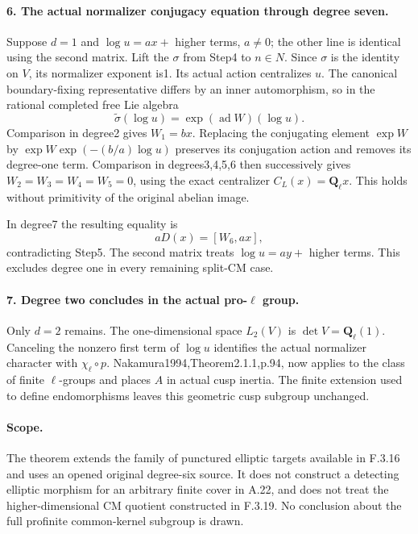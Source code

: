 \paragraph{6. The actual normalizer conjugacy equation through degree seven.}
Suppose $d=1$ and $\log u=ax+$ higher terms, $a\ne0$; the other
line is identical using the second matrix. Lift the $\sigma$ from
Step4 to $n\in N$. Since $\sigma$ is the identity on $V$, its
normalizer exponent is1. Its actual action centralizes $u$.
The canonical boundary-fixing representative differs by an inner
automorphism, so in the rational completed free Lie algebra
\[
 \widetilde\sigma(\log u)
 =\exp(\operatorname{ad}W)(\log u).
\]
Comparison in degree2 gives $W_1=bx$. Replacing the conjugating
element $\exp W$ by
$\exp W\exp(-(b/a)\log u)$ preserves its conjugation action and
removes its degree-one term. Comparison in degrees3,4,5,6 then
successively gives $W_2=W_3=W_4=W_5=0$, using the exact centralizer
$C_L(x)=\mathbf Q_\ell x$. This holds without primitivity of the
original abelian image.

In degree7 the resulting equality is
\[
 aD(x)=[W_6,ax],
\]
contradicting Step5. The second matrix treats $\log u=ay+$ higher
terms. This excludes degree one in every remaining split-CM case.

\paragraph{7. Degree two concludes in the actual pro-$\ell$ group.}
Only $d=2$ remains. The one-dimensional space $L_2(V)$ is
$\det V=\mathbf Q_\ell(1)$. Canceling the nonzero first term of
$\log u$ identifies the actual normalizer character with
$\chi_\ell\circ p$. Nakamura1994,Theorem2.1.1,p.94, now applies
to the class of finite $\ell$-groups and places $A$ in actual cusp
inertia. The finite extension used to define endomorphisms leaves
this geometric cusp subgroup unchanged.

\paragraph{Scope.}
The theorem extends the family of punctured elliptic targets available
in F.3.16 and uses an opened original degree-six source. It does not
construct a detecting elliptic morphism for an arbitrary finite
cover in A.22, and does not treat the higher-dimensional CM quotient
constructed in F.3.19. No conclusion about the full profinite
common-kernel subgroup is drawn.
